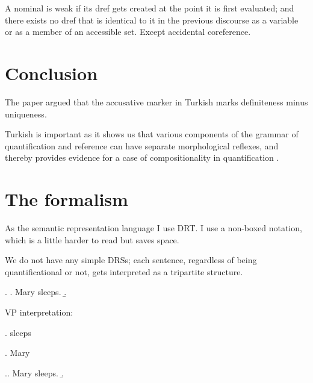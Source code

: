 \documentclass[11pt,a4paper]{article}
\begin{document}
\begin{comment}
* 51-2 inflection -- like plural in their case -- requires local accommodation, while lexical determiners are more flexible. 

* Plurarlity is an indicator of non-atomicity.

# Lopez 2012:

* syntactic structure limits the availability of modes of combination; its effect is not direct as in diesing92.

\end{comment}

\begin{udefinition}
A nominal is weak if its dref gets created at the point it is first evaluated; and there exists no dref that is identical to it in the previous discourse as a variable or as a member of an accessible set. Except accidental coreference.
\end{udefinition}


\section{Conclusion}

The paper argued that the accusative marker in Turkish marks definiteness minus
uniqueness.

Turkish is important as it shows us that various components of the grammar of quantification and reference can have separate morphological reflexes, and thereby provides evidence for a case of compositionality in quantification .

\appendix

\section{The formalism}

As the semantic representation language I use DRT. I use a non-boxed notation, which is a little harder to read but saves space.  

We do not have any simple DRSs; each sentence, regardless of being quantificational or not, gets interpreted as a tripartite structure. 


\ex. 
\a. Mary sleeps.
\b. 


VP interpretation:

\ex. sleeps 

\ex. Mary   

\ex.\a. Mary sleeps.
\b. \sysm{[x: x = m']\langle \forall \rangle [: sleeps'm']} 
\end{document}
